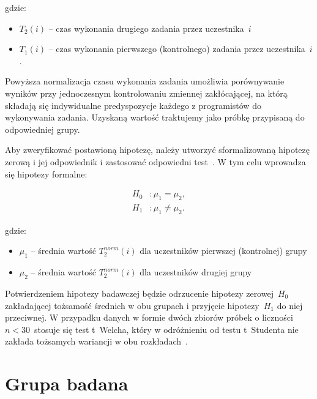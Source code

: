 gdzie:

\begin{itemize}
    \item \( T_2(i) \) -- czas wykonania drugiego zadania przez uczestnika~\(i\)
    \item \( T_1(i) \) -- czas wykonania pierwszego (kontrolnego) zadania przez uczestnika~\(i\).
\end{itemize}

Powyższa normalizacja czasu wykonania zadania umożliwia porównywanie wyników przy jednoczesnym kontrolowaniu
zmiennej zakłócającej, na którą składają się indywidualne predyspozycje każdego z programistów do wykonywania zadania.
Uzyskaną wartość traktujemy jako próbkę przypisaną do odpowiedniej grupy.

Aby zweryfikować postawioną hipotezę, należy utworzyć sformalizowaną hipotezę zerową i
jej odpowiednik i zastosować odpowiedni test~\cite{wohlin2012experimentation:hypotheses}.
W tym celu wprowadza się hipotezy formalne:

\begin{equation}
    \label{eq:hypotheses}
    \begin{aligned}
        H_{0} &: \mu_{1} = \mu_{2}, \\
        H_{1} &: \mu_{1} \neq \mu_{2}.
    \end{aligned}
\end{equation}

gdzie:

\begin{itemize}
    \item \(\mu_{1}\) -- średnia wartość \(T_2^{norm}(i)\) dla uczestników pierwszej (kontrolnej) grupy
    \item \(\mu_{2}\) -- średnia wartość \(T_2^{norm}(i)\) dla uczestników drugiej grupy
\end{itemize}

Potwierdzeniem hipotezy badawczej będzie odrzucenie hipotezy zerowej~\(H_{0}\) zakładającej tożsamość średnich w obu
grupach i przyjęcie hipotezy~\(H_{1}\) do niej przeciwnej.
W przypadku danych w formie dwóch zbiorów próbek o liczności~\(n < 30\)~stosuje się test t~Welcha, który w
odróżnieniu od testu
t~Studenta nie zakłada tożsamych wariancji w obu rozkładach~\cite{arciszewska2023metodologia}.

\section{Grupa badana}

